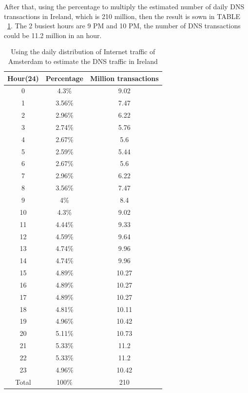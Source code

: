After that, using the percentage to multiply the estimated number of daily DNS transactions in Ireland, which is 210 million, then the result is sown in TABLE ~\ref{tab:table_dns_Ireland}. The 2 busiest hours are 9 PM and 10 PM, the number of DNS transactions could be  11.2 million in an hour.
\\

\begin{table}[hbt!]
    \centering
    \begin{tabular}{|c|c|c|}
        \hline
         Hour(24) & Percentage & Million transactions\\
        \hline
        0 & 4.3\% & 9.02 \\
        \hline
        1 & 3.56\% & 7.47 \\
        \hline
        2 & 2.96\% & 6.22 \\
        \hline
        3 & 2.74\% & 5.76 \\
        \hline
        4 & 2.67\% & 5.6 \\
        \hline
        5 & 2.59\% & 5.44 \\
        \hline
        6 & 2.67\% & 5.6  \\
        \hline
        7 & 2.96\% & 6.22  \\
        \hline
        8 & 3.56\% & 7.47  \\
        \hline
        9 & 4\% & 8.4  \\
        \hline
        10 & 4.3\% & 9.02  \\
        \hline
        11 & 4.44\% & 9.33 \\
        \hline
        12 & 4.59\% & 9.64  \\
        \hline
        13 & 4.74\% & 9.96 \\
        \hline
        14 & 4.74\% & 9.96 \\
        \hline
        15 & 4.89\% & 10.27 \\
        \hline
        16 & 4.89\% & 10.27 \\
        \hline
        17 & 4.89\% & 10.27 \\
        \hline
        18 & 4.81\% & 10.11 \\
        \hline
        19 & 4.96\% & 10.42 \\
        \hline
        20 & 5.11\% & 10.73 \\
        \hline
        21 & 5.33\% & 11.2 \\
        \hline
        22 & 5.33\% & 11.2 \\
        \hline
        23 & 4.96\% & 10.42 \\
        \hline
        Total & 100\% & 210  \\
        \hline
    \end{tabular}
    \caption{Using the daily distribution of Internet traffic of Amsterdam to estimate the DNS traffic in Ireland \cite{Amsterdam_internet_traffic}}
    \label{tab:table_dns_Ireland}
\end{table}

